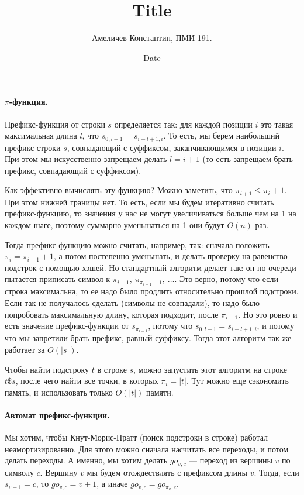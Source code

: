 \documentclass[12pt]{article}
\title{Title}
\author{Амеличев Константин, ПМИ 191.}
\date{Date}
\begin{document}
\paragraph{$\pi$-функция.} Префикс-функция от строки $s$ определяется так: для каждой позиции $i$ это такая максимальная длина $l$, что $s_{0, l - 1} = s_{i - l + 1, i}$. То есть, мы берем наибольший префикс строки $s$, совпадающий с суффиксом, заканчивающимся в позиции $i$. При этом мы искусственно запрещаем делать $l = i + 1$ (то есть запрещаем брать префикс, совпадающий с суффиксом).

Как эффективно вычислять эту функцию? Можно заметить, что $\pi_{i + 1} \le \pi_i + 1$. При этом нижней границы нет. То есть, если мы будем итеративно считать префикс-функцию, то значения у нас не могут увеличиваться больше чем на 1 на каждом шаге, поэтому суммарно уменьшаться на 1 они будут $O(n)$ раз. 

Тогда префикс-функцию можно считать, например, так: сначала положить $\pi_i = \pi_{i - 1} + 1$, а потом постепенно уменьшать, и делать проверку на равенство подстрок с помощью хэшей. Но стандартный алгоритм делает так: он по очереди пытается приписать символ к $\pi_{i - 1},\ \pi_{\pi_{i - 1} - 1},\ \ldots$. Это верно, потому что если строка максимальна, то ее надо было продлить относительно прошлой подстроки. Если так не получалось сделать (символы не совпадали), то надо было попробовать максимальную длину, которая подходит, после $\pi_{i - 1}$. Но это ровно и есть значение префикс-функции от $s_{\pi_{i - 1}}$, потому что $s_{0, l - 1} = s_{i - l + 1, i}$, и потому что мы запретили брать префикс, равный суффиксу. Тогда этот алгоритм так же работает за $O(|s|)$.

Чтобы найти подстроку $t$ в строке $s$, можно запустить этот алгоритм на строке $t\$s$, после чего найти все точки, в которых $\pi_i = |t|$. Тут можно еще сэкономить память, и использовать только $O(|t|)$ памяти.

\paragraph{Автомат префикс-функции.} Мы хотим, чтобы Кнут-Морис-Пратт (поиск подстроки в строке) работал неамортизированно. Для этого можно сначала насчитать все переходы, и потом делать переходы. А именно, мы хотим делать $go_{v, c}$ --- переход из вершины $v$ по символу $c$. Вершину $v$ мы будем отождествлять с префиксом длины $v$. Тогда, если $s_{v + 1} = c$, то $go_{v, c} = v + 1$, а иначе $go_{v, c} = go_{\pi_{v}, c}$.
\end{document}
